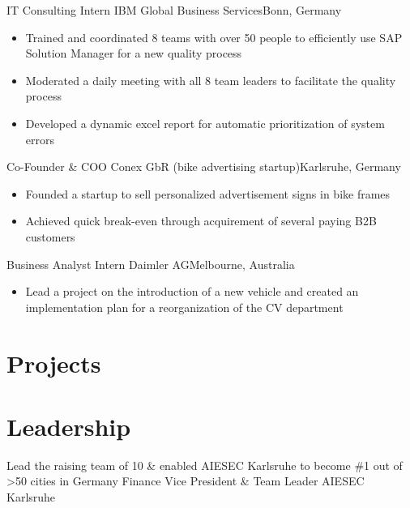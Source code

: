 \documentclass{my_cv}
\begin{document}
{IT Consulting Intern}
{IBM Global Business Services}{Bonn, Germany}
{}
{
\begin{itemize}
\item Trained and coordinated 8 teams with over 50 people to efficiently use SAP Solution Manager for a new quality process
\item Moderated a daily meeting with all 8 team leaders to facilitate the quality process
\item Developed a dynamic excel report for automatic prioritization of system errors
\end{itemize}
}  %

{Co-Founder \& COO}
{Conex GbR (bike advertising startup)}{Karlsruhe, Germany}
{}
{
\begin{itemize}
\item Founded a startup to sell personalized advertisement signs in bike frames
\item Achieved quick break-even through acquirement of several paying B2B customers
\end{itemize}
}  %

{Business Analyst Intern}
{Daimler AG}{Melbourne, Australia}
{}
{
\begin{itemize}
\item Lead a project on the introduction of a new vehicle and created an implementation plan for a reorganization of the CV department
\end{itemize}
}  %

\section{Projects}

\section{Leadership}
 \cventry{}
 {Lead the raising team of 10 \& enabled AIESEC Karlsruhe to become \#1 out of >50 cities in Germany}
 {Finance Vice President \& Team Leader}
 {AIESEC Karlsruhe}
 {}{} 
\end{document}

